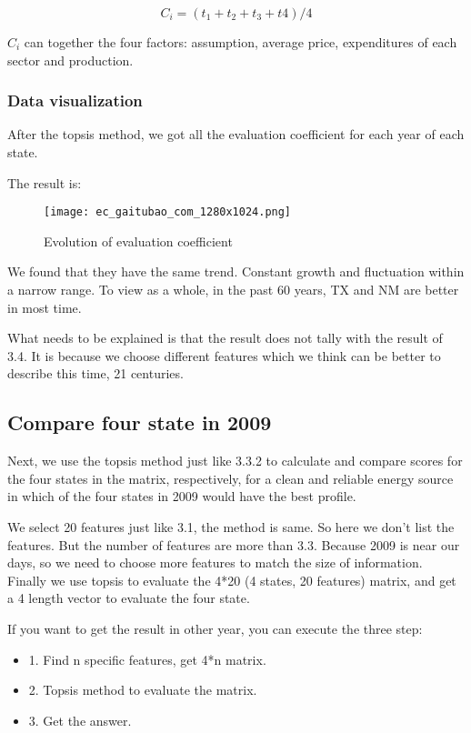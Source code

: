 \documentclass[a4paper]{article}
\begin{document}
\[C_i = (t_1 + t_2 + t_3 + t4) / 4\]

$C_i$ can together the four factors: assumption, average price, expenditures of each sector and production.

\subsubsection{Data visualization}

After the topsis method, we got all the evaluation coefficient for each year of each state.

The result is:

\begin{figure}[H]
	\begin{center}
		\texttt{[image: ec\_gaitubao\_com\_1280x1024.png]}
		\caption{Evolution of evaluation coefficient}
		\label{Fig:1}
	\end{center}
	\vspace{-0.5em}
\end{figure}

We found that they have the same trend. Constant growth and fluctuation within a narrow range. To view as a whole, in the past 60 years, TX and NM are better in most time.

What needs to be explained is that the result does not tally with the result of 3.4. It is because we choose different features which we think can be better to describe this time, 21 centuries. 

\subsection{Compare four state in 2009}

Next, we use the topsis method just like 3.3.2 to calculate and compare scores for the four states in the matrix, respectively, for a clean and reliable energy source in which of the four states in 2009 would have the best profile. 

We select 20 features just like 3.1, the method is same. So here we don't list the features. But the number of features are more than 3.3. Because 2009 is near our days, so we need to choose more features to match the size of information. Finally we use topsis to evaluate the 4*20 (4 states, 20 features) matrix, and get a 4 length vector to evaluate the four state.

If you want to get the result in other year, you can execute the three step:

\begin{itemize}
\item 1. Find n specific features, get 4*n matrix.
\item 2. Topsis method to evaluate the matrix.
\item 3. Get the answer.
\end{itemize}
\end{document}
